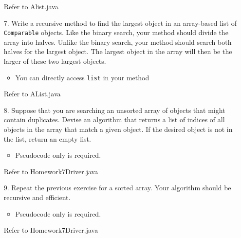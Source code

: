 \documentclass[10pt]{article}
\begin{document}
\begin{enumerate}
			\vspace{0.5cm}
			Refer to Alist.java
			\vspace{0.5cm}
		
		\item[7.] Write a recursive method to find the largest object in an array-based list of \texttt{Comparable} objects. Like the binary search, your method should divide the array into halves. Unlike the binary search, your method should search both halves for the largest object. The largest object in the array will then be the larger of these two largest objects.
			
			\begin{itemize}
				\item You can directly access \texttt{list} in your method
			\end{itemize}
			
			\vspace{0.5cm}
			Refer to AList.java
			\vspace{0.5cm}
		
		\item[8.] Suppose that you are searching an unsorted array of objects that might contain duplicates. Devise an algorithm that returns a list of indices of all objects in the array that match a given object. If the desired object is not in the list, return an empty list.
		
			\begin{itemize}
				\item Pseudocode only is required.
			\end{itemize}
			
			\vspace{0.5cm}
			Refer to Homework7Driver.java
			\vspace{0.5cm}
		
		\item[9.] Repeat the previous exercise for a sorted array. Your algorithm should be recursive and efficient.
			
			\begin{itemize}
				\item Pseudocode only is required.
			\end{itemize}
			
			\vspace{0.5cm}
			Refer to Homework7Driver.java
			\vspace{0.5cm}
	\end{enumerate}
\end{document}
